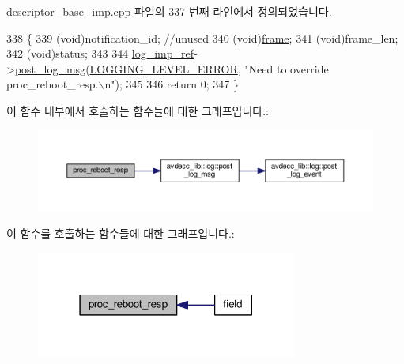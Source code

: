 descriptor\+\_\+base\+\_\+imp.\+cpp 파일의 337 번째 라인에서 정의되었습니다.


\begin{DoxyCode}
338 \{
339     (void)notification\_id; \textcolor{comment}{//unused}
340     (void)\hyperlink{gst__avb__playbin_8c_ac8e710e0b5e994c0545d75d69868c6f0}{frame};
341     (void)frame\_len;
342     (void)status;
343 
344     \hyperlink{namespaceavdecc__lib_acbe3e2a96ae6524943ca532c87a28529}{log\_imp\_ref}->\hyperlink{classavdecc__lib_1_1log_a68139a6297697e4ccebf36ccfd02e44a}{post\_log\_msg}(\hyperlink{namespaceavdecc__lib_a501055c431e6872ef46f252ad13f85cdaf2c4481208273451a6f5c7bb9770ec8a}{LOGGING\_LEVEL\_ERROR}, \textcolor{stringliteral}{"Need to
       override proc\_reboot\_resp.\(\backslash\)n"});
345 
346     \textcolor{keywordflow}{return} 0;
347 \}
\end{DoxyCode}


이 함수 내부에서 호출하는 함수들에 대한 그래프입니다.\+:
\nopagebreak
\begin{figure}[H]
\begin{center}
\leavevmode
\includegraphics[width=350pt]{classavdecc__lib_1_1descriptor__base__imp_a8b3de398748e8299daf7296964f73c22_cgraph}
\end{center}
\end{figure}




이 함수를 호출하는 함수들에 대한 그래프입니다.\+:
\nopagebreak
\begin{figure}[H]
\begin{center}
\leavevmode
\includegraphics[width=243pt]{classavdecc__lib_1_1descriptor__base__imp_a8b3de398748e8299daf7296964f73c22_icgraph}
\end{center}
\end{figure}


